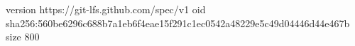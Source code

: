 version https://git-lfs.github.com/spec/v1
oid sha256:560be6296c688b7a1eb6f4eae15f291c1ec0542a48229e5c49d04446d44e467b
size 800
